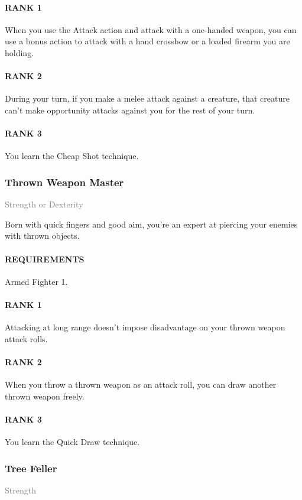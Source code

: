 \paragraph{RANK 1} When you use the Attack action and attack with a one-handed weapon, you can use a bonus action to attack with a hand crossbow or a loaded firearm you are holding.
\paragraph{RANK 2} During your turn, if you make a melee attack against a creature, that creature can't make opportunity attacks against you for the rest of your turn.
\paragraph{RANK 3} You learn the Cheap Shot technique.

\subsubsection{Thrown Weapon Master} \label{feat::thrownweaponmaster}
\small{\textcolor{gray}{Strength or Dexterity}}

\normalsize
Born with quick fingers and good aim, you're an expert at piercing your enemies with thrown objects.
\paragraph{REQUIREMENTS} Armed Fighter 1.
\paragraph{RANK 1} Attacking at long range doesn't impose disadvantage on your thrown weapon attack rolls.
\paragraph{RANK 2} When you throw a thrown weapon as an attack roll, you can draw another thrown weapon freely.
\paragraph{RANK 3} You learn the Quick Draw technique.

\subsubsection{Tree Feller} \label{feat::treefeller}
\small{\textcolor{gray}{Strength}}

